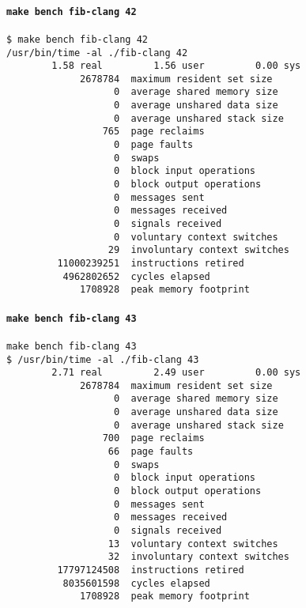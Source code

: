 \documentclass{article}
\begin{document}
\paragraph{\lstinline!make bench fib-clang 42!}
\begin{lstlisting}[language=none]
$ make bench fib-clang 42
/usr/bin/time -al ./fib-clang 42
        1.58 real         1.56 user         0.00 sys
             2678784  maximum resident set size
                   0  average shared memory size
                   0  average unshared data size
                   0  average unshared stack size
                 765  page reclaims
                   0  page faults
                   0  swaps
                   0  block input operations
                   0  block output operations
                   0  messages sent
                   0  messages received
                   0  signals received
                   0  voluntary context switches
                  29  involuntary context switches
         11000239251  instructions retired
          4962802652  cycles elapsed
             1708928  peak memory footprint
\end{lstlisting}
\paragraph{\lstinline!make bench fib-clang 43!}
\begin{lstlisting}[language=none]
make bench fib-clang 43
$ /usr/bin/time -al ./fib-clang 43
        2.71 real         2.49 user         0.00 sys
             2678784  maximum resident set size
                   0  average shared memory size
                   0  average unshared data size
                   0  average unshared stack size
                 700  page reclaims
                  66  page faults
                   0  swaps
                   0  block input operations
                   0  block output operations
                   0  messages sent
                   0  messages received
                   0  signals received
                  13  voluntary context switches
                  32  involuntary context switches
         17797124508  instructions retired
          8035601598  cycles elapsed
             1708928  peak memory footprint
\end{lstlisting}
\end{document}
